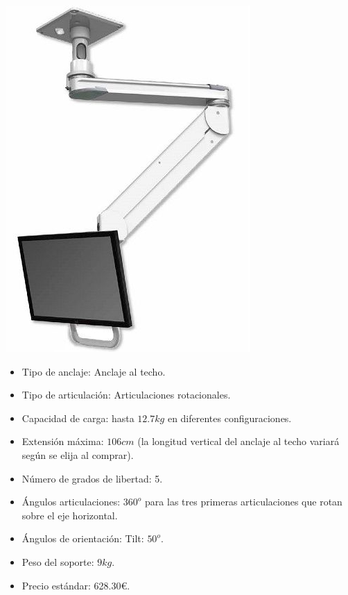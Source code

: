  \begin{minipage}{0.35\textwidth}
 	\includegraphics[width=\linewidth]{figuras/Imagenes_EstadoArte/T2EQ.jpg}
 \end{minipage}
 \begin{minipage}{0.65\textwidth}\raggedright
 	\hspace{1cm}
 	\begin{itemize}
 		\item Tipo de anclaje: Anclaje al techo.
 		\item Tipo de articulación: Articulaciones rotacionales.
 		\item Capacidad de carga: hasta $12.7kg$ en diferentes configuraciones.
 		\item Extensión máxima: $106cm$ (la longitud vertical del anclaje al techo variará según se elija al comprar).
 		\item Número de grados de libertad: 5.
 		\item Ángulos articulaciones: $360^o$ para las tres primeras articulaciones que rotan sobre el eje horizontal.
 		\item Ángulos de orientación: Tilt: $50^o$.
 		 		\item Peso del soporte: $9kg$.
 		\item Precio estándar: 628.30\euro.
 	\end{itemize}
 \end{minipage}
 \\ 
 
